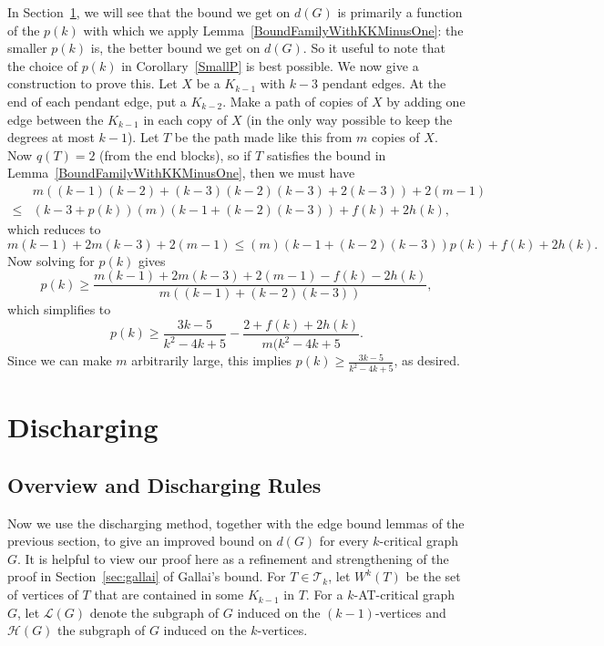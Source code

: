 \documentclass[12pt]{article}
\theoremstyle{plain}
\theoremstyle{definition}
\theoremstyle{remark}
\newcommand{\fancy}[1]{\mathcal{#1}}
\newcommand{\T}{\fancy{T}}
\renewcommand{\L}{\fancy{L}}
\newcommand{\HH}{\fancy{H}}
\begin{document}
In Section~\ref{discharging}, we will see that the bound we get on $d(G)$ is primarily a function of the $p(k)$ with which we 
apply Lemma~\ref{BoundFamilyWithKKMinusOne}: the smaller $p(k)$ is, the better bound we get on $d(G)$.  So it useful to note 
that the choice of $p(k)$ in Corollary~\ref{SmallP} is best possible.  We now give a construction to prove this.
Let $X$ be a $K_{k-1}$ with $k-3$ pendant edges.  At the end of each pendant edge, put a $K_{k-2}$.  Make a path of copies of $X$
by adding one edge between the $K_{k-1}$ in each copy of $X$ (in the only way possible to keep the degrees at most $k-1$).  Let 
$T$ be the path made like this from $m$ copies of $X$.  Now $q(T) = 2$ (from the end blocks), so if $T$ satisfies the bound in Lemma~\ref{BoundFamilyWithKKMinusOne}, then we must have
\begin{align*}
&m((k-1)(k-2) + (k-3)(k-2)(k-3) + 2(k-3)) + 2(m-1) \\
\le &(k-3 + p(k))(m)(k-1+(k-2)(k-3)) + f(k) + 2h(k),
\end{align*}
which reduces to
\[m(k-1) + 2m(k-3) + 2(m-1) \le (m)(k-1+(k-2)(k-3))p(k) + f(k) + 2h(k).\]
Now solving for $p(k)$ gives
\[p(k) \ge \frac{m(k-1)+2m(k-3)+2(m-1)-f(k)-2h(k)}{m((k-1)+(k-2)(k-3))},\] 
which simplifies to
\[p(k) \ge \frac{3k - 5}{k^2 - 4k + 5}-\frac{2+f(k)+2h(k)}{m(k^2-4k+5}.\]
Since we can make $m$ arbitrarily large, this implies $p(k)\ge \frac{3k-5}{k^2-4k+5}$, as desired.

\section{Discharging}\label{discharging}

\subsection{Overview and Discharging Rules}

Now we use the discharging method, together with the edge bound lemmas of the previous section, to give an improved bound on $d(G)$ 
for every $k$-critical graph $G$.  It is helpful to view our proof here as a refinement and strengthening of the proof in
Section~\ref{sec:gallai} of Gallai's bound.  For $T \in \T_k$, let $W^k(T)$ be the set of vertices of $T$ that are contained in 
some $K_{k-1}$ in $T$.  For a $k$-AT-critical graph $G$, let $\L(G)$ denote the subgraph of $G$ induced on the $(k-1)$-vertices and 
$\HH(G)$ the subgraph of $G$ induced on the $k$-vertices.     
\end{document}

